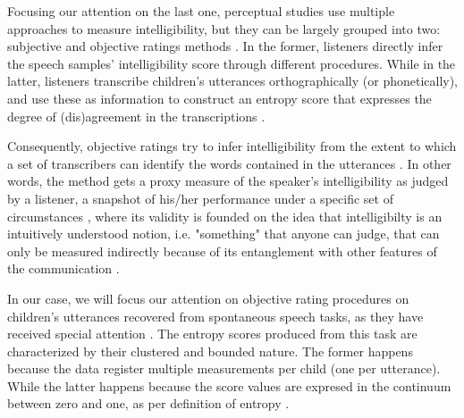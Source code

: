 \begin{comment}	
	
	On both instances, the stimuli (children's utterances) can be generated from reading at loud, contextualized utterances, or spontaneous speech tasks\footnote{ordered on increasing level of ecological validity \citep{Flipsen_2006, Ertmer_2011}}.
	
	Based on their description, it seems that perceptual are more subjective than acoustic studies, as they do not rely on "objective" measurements, i.e. time duration, wave amplitude, among others, available in the former. However, for the case of SI, there are objective and subjective assessment methodologies.
		
\end{comment}

Focusing our attention on the last one, perceptual studies use multiple approaches to measure intelligibility, but they can be largely grouped into two: subjective and objective ratings methods \citep{Hustad_et_al_2020}. In the former, listeners directly infer the speech samples' intelligibility score through different procedures. While in the latter, listeners transcribe children's utterances orthographically (or phonetically), and use these as information to construct an entropy score that expresses the degree of (dis)agreement in the transcriptions \citep{Boonen_et_al_2021, Shannon_1948}. 

Consequently, objective ratings try to infer intelligibility from the extent to which a set of transcribers can identify the words contained in the utterances \citep{Boonen_et_al_2021}. In other words, the method gets a proxy measure of the speaker's intelligibility as judged by a listener, a snapshot of his/her performance under a specific set of circumstances \citep{Hustad_et_al_2020}, where its validity is founded on the idea that intelligibilty is an intuitively understood notion, i.e. "something" that anyone can judge, that can only be measured indirectly because of its entanglement with other features of the communication \citep{Guilford_1954, Stevens_1946}.

In our case, we will focus our attention on objective rating procedures on children's utterances recovered from spontaneous speech tasks, as they have received special attention \citep{Boonen_et_al_2021, Hustad_et_al_2020}. The entropy scores produced from this task are characterized by their clustered and bounded nature. The former happens because the data register multiple measurements per child (one per utterance). While the latter happens because the score values are expresed in the continuum between zero and one, as per definition of entropy \citep{Shannon_1948}.

